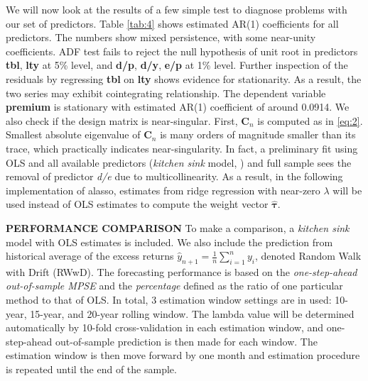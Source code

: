 \documentclass[12pt,a4paper]{article}
\begin{document}
We will now look at the results of a few simple test to diagnose problems with our set of predictors. Table \ref{tab:4} shows estimated AR(1) coefficients for all predictors. The numbers show mixed persistence, with some near-unity coefficients. ADF test fails to reject the null hypothesis of unit root in predictors \textbf{tbl}, \textbf{lty} at 5\% level, and \textbf{d/p}, \textbf{d/y}, \textbf{e/p} at 1\% level. Further inspection of the residuals by regressing \textbf{tbl} on \textbf{lty} shows evidence for stationarity. As a result, the two series may exhibit cointegrating relationship. The dependent variable \textbf{premium} is stationary with estimated AR(1) coefficient of around 0.0914. We also check if the design matrix is near-singular. First, $ \bm{C}_n $ is computed as in \eqref{eq:2}. Smallest absolute eigenvalue of $ \bm{C}_n $ is many orders of magnitude smaller than its trace, which practically indicates near-singularity. In fact, a preliminary fit using OLS and all available predictors (\textit{kitchen sink} model, \cite{welch2008comprehensive}) and full sample sees the removal of predictor \textit{d/e} due to multicollinearity. As a result, in the following implementation of alasso, estimates from ridge regression with near-zero $ \lambda $ will be used instead of OLS estimates to compute the weight vector $ \hat{\bm{\tau}} $.


\textbf{PERFORMANCE COMPARISON} To make a comparison, a \textit{kitchen sink} model with OLS estimates is included. We also include the prediction from historical average of the excess returns $ \hat{y}_{n + 1} = \frac{1}{n} \sum^n_{i = 1}y_i $, denoted Random Walk with Drift (RWwD). The forecasting performance is based on the \textit{one-step-ahead out-of-sample MPSE} and the \textit{percentage} defined as the ratio of one particular method to that of OLS. In total, 3 estimation window settings are in used: 10-year, 15-year, and 20-year rolling window. The lambda value will be determined automatically by 10-fold cross-validation in each estimation window, and one-step-ahead out-of-sample prediction is then made for each window. The estimation window is then move forward by one month and estimation procedure is repeated until the end of the sample.
\end{document}
